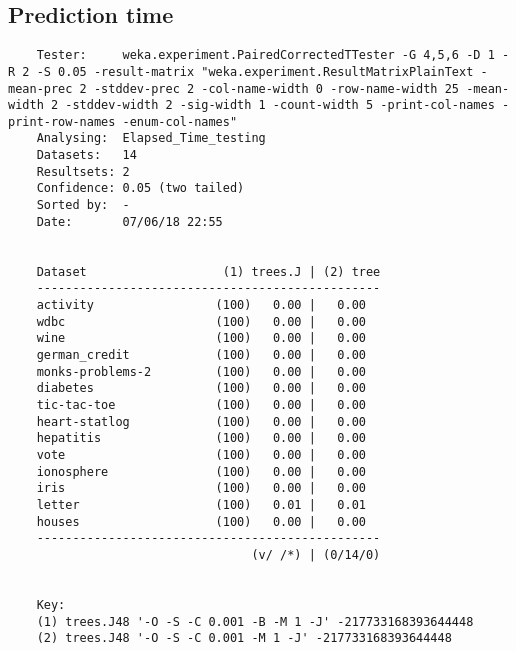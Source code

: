 \subsection{Prediction time}
\begin{verbatim}
    Tester:     weka.experiment.PairedCorrectedTTester -G 4,5,6 -D 1 -R 2 -S 0.05 -result-matrix "weka.experiment.ResultMatrixPlainText -mean-prec 2 -stddev-prec 2 -col-name-width 0 -row-name-width 25 -mean-width 2 -stddev-width 2 -sig-width 1 -count-width 5 -print-col-names -print-row-names -enum-col-names"
    Analysing:  Elapsed_Time_testing
    Datasets:   14
    Resultsets: 2
    Confidence: 0.05 (two tailed)
    Sorted by:  -
    Date:       07/06/18 22:55
    
    
    Dataset                   (1) trees.J | (2) tree
    ------------------------------------------------
    activity                 (100)   0.00 |   0.00  
    wdbc                     (100)   0.00 |   0.00  
    wine                     (100)   0.00 |   0.00  
    german_credit            (100)   0.00 |   0.00  
    monks-problems-2         (100)   0.00 |   0.00  
    diabetes                 (100)   0.00 |   0.00  
    tic-tac-toe              (100)   0.00 |   0.00  
    heart-statlog            (100)   0.00 |   0.00  
    hepatitis                (100)   0.00 |   0.00  
    vote                     (100)   0.00 |   0.00  
    ionosphere               (100)   0.00 |   0.00  
    iris                     (100)   0.00 |   0.00  
    letter                   (100)   0.01 |   0.01  
    houses                   (100)   0.00 |   0.00  
    ------------------------------------------------
                                  (v/ /*) | (0/14/0)
    
    
    Key:
    (1) trees.J48 '-O -S -C 0.001 -B -M 1 -J' -217733168393644448
    (2) trees.J48 '-O -S -C 0.001 -M 1 -J' -217733168393644448    
\end{verbatim}